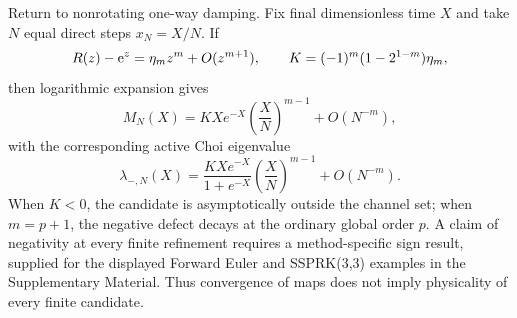 Return to nonrotating one-way damping. Fix final dimensionless time $X$ and take $N$ equal direct steps $x_N=X/N$. If
\begin{equation}
 R(z)-\mathrm{e}^z=\eta_mz^m+O(z^{m+1}),
 \qquad
 K=(-1)^m(1-2^{1-m})\eta_m,
\end{equation}
then logarithmic expansion gives
\begin{equation}
 M_N(X)=KXe^{-X}\left(\frac{X}{N}\right)^{m-1}+O(N^{-m}),
 \label{eq:fixed_horizon_margin}
\end{equation}
with the corresponding active Choi eigenvalue
\begin{equation}
 \lambda_{-,N}(X)=\frac{KXe^{-X}}{1+e^{-X}}
 \left(\frac{X}{N}\right)^{m-1}+O(N^{-m}).
 \label{eq:fixed_horizon_eig}
\end{equation}
When $K<0$, the candidate is asymptotically outside the channel set; when $m=p+1$, the negative defect decays at the ordinary global order $p$. A claim of negativity at every finite refinement requires a method-specific sign result, supplied for the displayed Forward Euler and SSPRK(3,3) examples in the Supplementary Material. Thus convergence of maps does not imply physicality of every finite candidate.
